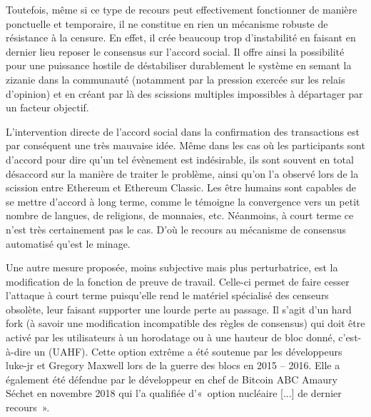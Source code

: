 Toutefois, même si ce type de recours peut effectivement fonctionner de manière ponctuelle et temporaire, il ne constitue en rien un mécanisme robuste de résistance à la censure. En effet, il crée beaucoup trop d'instabilité en faisant en dernier lieu reposer le consensus sur l'accord social. Il offre ainsi la possibilité pour une puissance hostile de déstabiliser durablement le système en semant la zizanie dans la communauté (notamment par la pression exercée sur les relais d'opinion) et en créant par là des scissions multiples impossibles à départager par un facteur objectif.

L'intervention directe de l'accord social dans la confirmation des transactions est par conséquent une très mauvaise idée. Même dans les cas où les participants sont d'accord pour dire qu'un tel évènement est indésirable, ils sont souvent en total désaccord sur la manière de traiter le problème, ainsi qu'on l'a observé lors de la scission entre Ethereum et Ethereum Classic. Les être humains sont capables de se mettre d'accord à long terme, comme le témoigne la convergence vers un petit nombre de langues, de religions, de monnaies, etc. Néanmoins, à court terme ce n'est très certainement pas le cas. D'où le recours au mécanisme de consensus automatisé qu'est le minage.


Une autre mesure proposée, moins subjective mais plus perturbatrice, est la modification de la fonction de preuve de travail. Celle-ci permet de faire cesser l'attaque à court terme puisqu'elle rend le matériel spécialisé des censeurs obsolète, leur faisant supporter une lourde perte au passage. Il s'agit d'un hard fork (à savoir une modification incompatible des règles de consensus) qui doit être activé par les utilisateurs à un horodatage ou à une hauteur de bloc donné, c'est-à-dire un  (UAHF). Cette option extrême a été soutenue par les développeurs luke-jr et Gregory Maxwell lors de la guerre des blocs en 2015 -- 2016. Elle a également été défendue par le développeur en chef de Bitcoin ABC Amaury Séchet en novembre 2018 qui l'a qualifiée d'«~option nucléaire [...] de dernier recours~».

